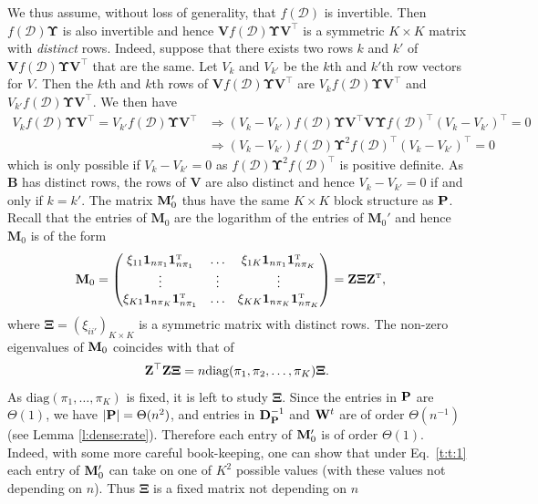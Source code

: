 \documentclass[10pt,journal,compsoc]{IEEEtran}
\newcommand{\ee}{\end{aligned} \end{equation}}
\newcommand{\bds}{\boldsymbol}
\newcommand{\T}{\top}
\def\T{{ \mathrm{\scriptscriptstyle T} }} %
\newcommand{\bee}{\begin{equation}\begin{aligned}}
\newcommand{\M}[1]{{{\mathbf{\MakeUppercase{#1}}}}}
\numberwithin{equation}{section}
\begin{document}
We thus assume, without loss of generality, that $f(\mathcal{D})$ is invertible. Then $f(\mathcal{D}) \bm{\Upsilon}$ is also invertible and hence
$\mathbf{V} f(\mathcal{D}) \bm{\Upsilon} \mathbf{V}^{\top}$ is a symmetric $K \times K$ matrix with {\em distinct} rows. Indeed, suppose that there exists two rows $k$ and $k'$ of 
$\mathbf{V} f(\mathcal{D}) \bm{\Upsilon} \mathbf{V}^{\top}$ that are the same. Let $V_k$ and $V_{k'}$ be the $k$th and $k'$th row vectors for $V$. Then the $k$th and $k$th rows of $\mathbf{V} f(\mathcal{D}) \bm{\Upsilon} \mathbf{V}^{\top}$ are $V_k f(\mathcal{D}) \bm{\Upsilon} \mathbf{V}^{\top}$ and $V_{k'} f(\mathcal{D}) \bm{\Upsilon} \mathbf{V}^{\top}$. We then have
\begin{equation*}
\begin{split}
V_k f(\mathcal{D}) \bm{\Upsilon} \mathbf{V}^{\top} = V_{k'} f(\mathcal{D}) \bm{\Upsilon} \mathbf{V}^{\top} &\Longrightarrow (V_k - V_{k'}) f(\mathcal{D}) \bm{\Upsilon} \mathbf{V}^{\top} \mathbf{V} \bm{\Upsilon} f(\mathcal{D})^{\top} (V_{k} - V_{k'})^{\top} = 0 \\ &\Longrightarrow (V_k - V_{k'}) f(\mathcal{D}) \bm{\Upsilon}^2 f(\mathcal{D})^{\top} (V_{k} - V_{k'})^{\top} = 0
\end{split}
\end{equation*}
which is only possible if $V_{k} - V_{k'} = 0$
as $f(\mathcal{D}) \bm{\Upsilon}^2 f(\mathcal{D})^{\top}$ is positive definite. As $\mathbf{B}$ has distinct rows, the rows of $\mathbf{V}$ are also distinct and hence $V_{k} - V_{k'} = 0$ if and only if $k = k'$. 
The matrix
$\M M_0'$
thus have the same $K \times K$ block structure as $\M P$. Recall that the entries of $\mathbf{M}_0$ are the logarithm of the entries of $\mathbf{M}_0'$ and hence $\mathbf{M}_0$ is of the form
\bee\nonumber
\M M_0 &= \begin{pmatrix}
\xi_{11} \bds 1_{n\pi_1} \bds 1_{n\pi_1}^\T &\dots & \xi_{1K} \bds 1_{n\pi_1} \bds 1_{n\pi_K}^\T\\
\vdots & \vdots & \vdots\\
\xi_{K1} \bds 1_{n\pi_K} \bds 1_{n\pi_1}^\T & \dots & \xi_{KK} \bds 1_{n\pi_K} \bds 1_{n\pi_K}^\T
\end{pmatrix} 
= 
\M Z  \bm{\Xi} \M Z^\T,
\ee
where $\bm{\Xi} = (\xi_{ii'})_{K
  \times K}$ is a symmetric matrix with distinct rows. The non-zero eigenvalues
of $\M M_0$ coincides with that of
\bee\label{trans}
\M Z^{\top} \M Z \bm{\Xi} = n \mathrm{diag}(\pi_1,
\pi_2, \dots, \pi_K) \bm{\Xi}.
\ee As $\text{diag}(\pi_1,\dots,\pi_K)$ is fixed, it is left to study $\bm{\Xi}$. Since the entries in $\M P$  are $\Theta(1)$, we have $|\M P| = \Theta(n^2)$, and entries in $\M D_{\M P}^{-1}$ and $\M W^t$ are of order $\Theta(n^{-1})$ (see Lemma \ref{l:dense:rate}). Therefore each entry of $\M M_{0}'$ is of order $\Theta(1)$. Indeed, with some more careful book-keeping, one can show that under Eq.~\eqref{t:t:1} each entry of $\M M_{0}'$  can take on one of $K^2$ possible values (with these values not depending on $n$). Thus $\bm{\Xi}$ is a fixed matrix not depending on $n$
\end{document}
